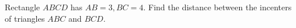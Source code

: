 Rectangle $ABCD$ has $AB=3,BC=4$. Find the distance between the incenters of triangles $ABC$ and $BCD$.

